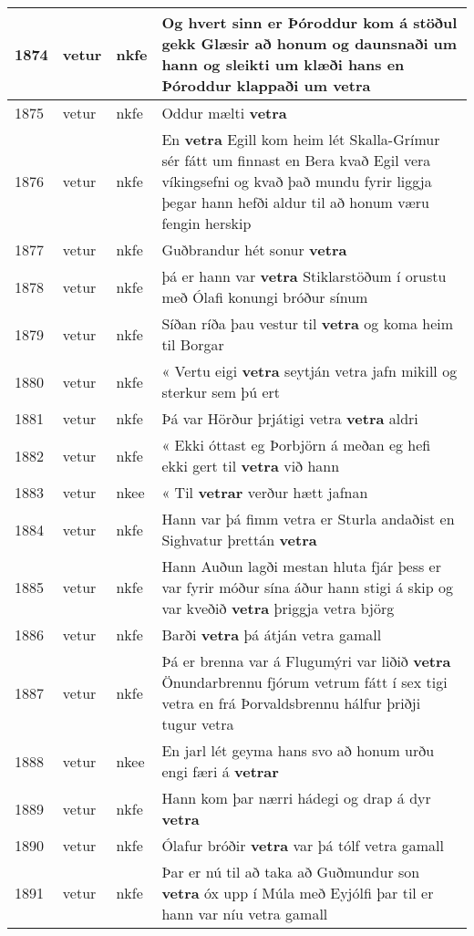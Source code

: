 \documentclass{article}
\begin{document}
\begin{longtable}{p{1cm}|p{1cm}|p{1cm}|p{13cm}}
\hline
1874&vetur&nkfe&Og hvert sinn er Þóroddur kom á stöðul gekk Glæsir að honum og daunsnaði um hann og sleikti um klæði hans en Þóroddur klappaði um \textbf{vetra} \\
\hline
1875&vetur&nkfe&Oddur mælti \textbf{vetra} \\
\hline
1876&vetur&nkfe&En \textbf{vetra} Egill kom heim lét Skalla-Grímur sér fátt um finnast en Bera kvað Egil vera víkingsefni og kvað það mundu fyrir liggja þegar hann hefði aldur til að honum væru fengin herskip\\
\hline
1877&vetur&nkfe&Guðbrandur hét sonur \textbf{vetra} \\
\hline
1878&vetur&nkfe&þá er hann var \textbf{vetra} Stiklarstöðum í orustu með Ólafi konungi bróður sínum\\
\hline
1879&vetur&nkfe&Síðan ríða þau vestur til \textbf{vetra} og koma heim til Borgar\\
\hline
1880&vetur&nkfe&« Vertu eigi \textbf{vetra} seytján vetra jafn mikill og sterkur sem þú ert\\
\hline
1881&vetur&nkfe&Þá var Hörður þrjátigi vetra \textbf{vetra} aldri\\
\hline
1882&vetur&nkfe&« Ekki óttast eg Þorbjörn á meðan eg hefi ekki gert til \textbf{vetra} við hann\\
\hline
1883&vetur&nkee&« Til \textbf{vetrar} verður hætt jafnan\\
\hline
1884&vetur&nkfe&Hann var þá fimm vetra er Sturla andaðist en Sighvatur þrettán \textbf{vetra} \\
\hline
1885&vetur&nkfe&Hann Auðun lagði mestan hluta fjár þess er var fyrir móður sína áður hann stigi á skip og var kveðið \textbf{vetra} þriggja vetra björg\\
\hline
1886&vetur&nkfe&Barði \textbf{vetra} þá átján vetra gamall\\
\hline
1887&vetur&nkfe&Þá er brenna var á Flugumýri var liðið \textbf{vetra} Önundarbrennu fjórum vetrum fátt í sex tigi vetra en frá Þorvaldsbrennu hálfur þriðji tugur vetra\\
\hline
1888&vetur&nkee&En jarl lét geyma hans svo að honum urðu engi færi á \textbf{vetrar} \\
\hline
1889&vetur&nkfe&Hann kom þar nærri hádegi og drap á dyr \textbf{vetra} \\
\hline
1890&vetur&nkfe&Ólafur bróðir \textbf{vetra} var þá tólf vetra gamall\\
\hline
1891&vetur&nkfe&Þar er nú til að taka að Guðmundur son \textbf{vetra} óx upp í Múla með Eyjólfi þar til er hann var níu vetra gamall\\

\end{longtable}
\end{document}
